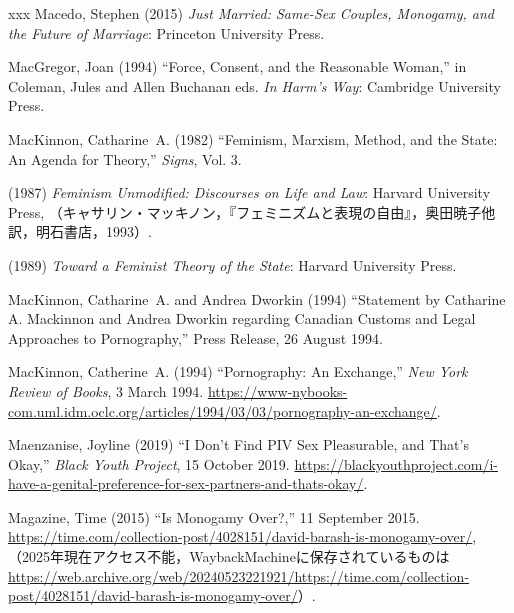 \documentclass[]{jlreq} \usepackage{mystyle}
\begin{document}
\begin{thebibliography}{xxx}
Macedo, Stephen (2015)  \textit{ Just Married: Same-Sex Couples, Monogamy, and
  the Future of Marriage}: Princeton University Press.

MacGregor, Joan (1994) ``Force, Consent, and the Reasonable Woman,'' in
  Coleman, Jules and Allen Buchanan eds.   \textit{ In Harm's Way}: Cambridge
  University Press.

MacKinnon, Catharine~A. (1982) ``Feminism, Marxism, Method, and the State: An
  Agenda for Theory,'' \textit{ Signs}, Vol. 3.

 \bysame{}  (1987)  \textit{ Feminism Unmodified: Discourses on Life and Law}:
  Harvard University Press,
  （キャサリン・マッキノン，『フェミニズムと表現の自由』，奥田暁子他訳，明石書店，1993）.

 \bysame{}  (1989)  \textit{ Toward a Feminist Theory of the State}: Harvard
  University Press.

MacKinnon, Catharine~A. and Andrea Dworkin (1994) ``Statement by Catharine A.
  Mackinnon and Andrea Dworkin regarding Canadian Customs and Legal Approaches
  to Pornography,'' Press Release, 26 August 1994.

MacKinnon, Catherine~A. (1994) ``Pornography: An Exchange,'' \emph{New York
  Review of Books}, 3 March 1994.
  \url{https://www-nybooks-com.uml.idm.oclc.org/articles/1994/03/03/pornography-an-exchange/}.

Maenzanise, Joyline (2019) ``I Don't Find {PIV} Sex Pleasurable, and That's
  Okay,'' \emph{Black Youth Project}, 15 October 2019.
  \url{https://blackyouthproject.com/i-have-a-genital-preference-for-sex-partners-and-thats-okay/}.

Magazine, Time (2015) ``Is Monogamy Over?,'' 11 September 2015.
  \url{https://time.com/collection-post/4028151/david-barash-is-monogamy-over/},
  （2025年現在アクセス不能，WaybackMachineに保存されているものは\url{https://web.archive.org/web/20240523221921/https://time.com/collection-post/4028151/david-barash-is-monogamy-over/}）.


\end{thebibliography}
\end{document}
